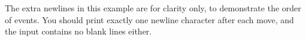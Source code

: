 The extra newlines in this example are for clarity only, to
demonstrate the order of events.  You should print exactly one newline
character after each move, and the input contains no blank lines
either.


\ifplastex %
\else
{}
\fi
